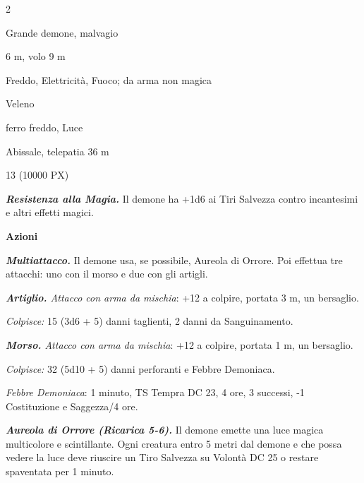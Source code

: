 \begin{multicols}{2}
{
\begin{description}[noitemsep, topsep=0pt, parsep=0pt, partopsep=0pt, itemsep=1pt, leftmargin=2.35cm,  labelwidth=2.2cm, itemindent=0cm, listparindent=0pt] %
\setlength{\baselineskip}{10pt}
\item[\textbf{Taglia/Tipo}] Grande demone, malvagio
\item[\textbf{Caratt.}] 
\item[\textbf{Punti Ferita}] 
\item[\textbf{Movimento}] 6 m, volo 9 m
\item[\textbf{Tiri Salvez.}] 
\item[\textbf{Res. Danni}] Freddo, Elettricità, Fuoco; da arma non magica
\item[\textbf{Imm. Danni}] Veleno
\item[\textbf{Vulnerabilità}] ferro freddo, Luce
\item[\textbf{Sensi}] 
\item[\textbf{Linguaggi}] Abissale, telepatia 36 m
\item[\textbf{Sfida}] 13 (10000 PX)
\end{description}
\smallskip

\emph{\textbf{Resistenza alla Magia.}} Il demone ha +1d6 ai Tiri Salvezza contro incantesimi e altri effetti magici.

\textbf{Azioni}

\emph{\textbf{Multiattacco.}} Il demone usa, se possibile, Aureola di Orrore. Poi effettua tre attacchi: uno con il morso e due con gli artigli.

\emph{\textbf{Artiglio.} Attacco con arma da mischia}: +12 a colpire, portata 3 m, un bersaglio.

\emph{Colpisce:} 15 (3d6 + 5) danni taglienti, 2 danni da Sanguinamento.

\emph{\textbf{Morso.} Attacco con arma da mischia}: +12 a colpire, portata 1 m, un bersaglio.

\emph{Colpisce:} 32 (5d10 + 5) danni perforanti e Febbre Demoniaca.

\emph{Febbre Demoniaca}: 1 minuto, TS Tempra DC 23, 4 ore, 3 successi, -1 Costituzione e Saggezza/4 ore.

\emph{\textbf{Aureola di Orrore (Ricarica 5-6).}} Il demone emette una luce magica multicolore e scintillante. Ogni creatura entro 5 metri dal demone e che possa vedere la luce deve riuscire un Tiro Salvezza su Volontà DC 25 o restare spaventata per 1 minuto.

}
\end{multicols}
